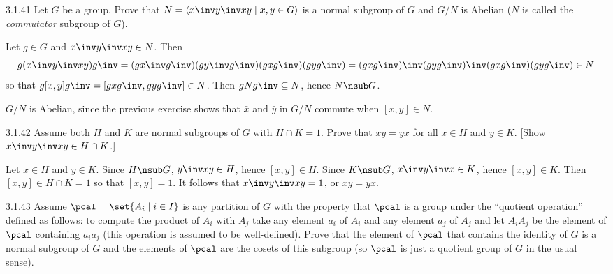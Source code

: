 \begin{spex}{3.1.41}
    Let $G$ be a group.
	Prove that $N = \langle x\inv y\inv xy \mid x,y \in G \rangle$ is a normal subgroup of $G$ and $G/N$ is Abelian ($N$ is called the \emph{commutator} subgroup of $G$).
\end{spex}

\begin{sol}[spsol]
    Let $g \in G$ and $x\inv y\inv xy \in N$.
	Then 
    \[
    	g(x\inv y\inv xy)g\inv = (gx\inv g\inv)(g y\inv g\inv)(gxg\inv)(gyg\inv) = (gxg\inv)\inv(gyg\inv)\inv(gxg\inv)(gyg\inv) \in N
    \]
    so that $g[x, y]g\inv = [gxg\inv, gyg\inv] \in N$.
	Then $gNg\inv \subseteq N$, hence $N \nsub G$.
    
    $G/N$ is Abelian, since the previous exercise shows that $\bar x$ and $\bar y$ in $G/N$ commute when $[x, y] \in N$.
\end{sol}

\begin{exercise}{3.1.42}
    Assume both $H$ and $K$ are normal subgroups of $G$ with $H \cap K = 1$.
	Prove that $xy = yx$ for all $x \in H$ and $y \in K$. [Show $x\inv y\inv xy \in H \cap K$.]
\end{exercise}

\begin{sol}
    Let $x \in H$ and $y \in K$.
	Since $H \nsub G$, $y\inv xy \in H$, hence $[x, y] \in H$.
	Since $K \nsub G$, $x\inv y\inv x\in K$, hence $[x, y] \in K$.
	Then $[x, y] \in H \cap K = 1$ so that $[x, y] = 1$.
	It follows that $x\inv y\inv xy = 1$, or $xy = yx$.
\end{sol}

\begin{spex}{3.1.43}
    Assume $\pcal = \set{A_i \mid i \in I}$ is any partition of $G$ with the property that $\pcal$ is a group under the ``quotient operation'' defined as follows: to compute the product of $A_i$ with $A_j$ take any element $a_i$ of $A_i$ and any element $a_j$ of $A_j$ and let $A_iA_j$ be the element of $\pcal$ containing $a_ia_j$ (this operation is assumed to be well-defined).
	Prove that the element of $\pcal$ that contains the identity of $G$ is a normal subgroup of $G$ and the elements of $\pcal$ are the cosets of this subgroup (so $\pcal$ is just a quotient group of $G$ in the usual sense).
\end{spex}

